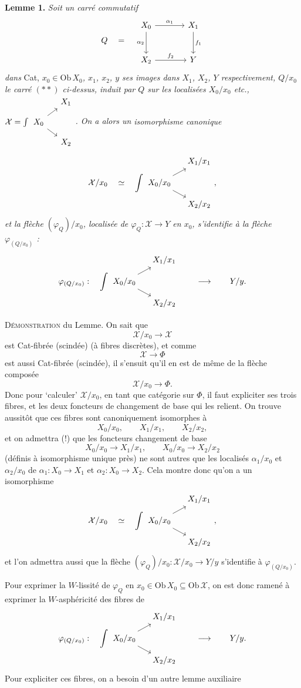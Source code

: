 \documentclass[11pt]{article}
\newcommand{\printedpage}[1]{\marginpar{\footnotesize p.~#1}}
\newcommand{\msp}[1]{\marginpar{\footnotesize [#1]}}
\newcommand{\intdiag}[3]{\int\begin{tikzcd}[row sep=small,column sep=small,ampersand replacement=\&,baseline=(\tikzcdmatrixname-2-1.base)] \& #2 \\ #1 \arrow[ur]\arrow[dr] \& \\ \& #3 \end{tikzcd}}
\begin{document}
\noindent\textbf{Lemme 1.} \textit{Soit un carré commutatif}
\[
Q \quad = \quad
\begin{tikzcd}[row sep=large,column sep=large]
X_0 \arrow[r, "\alpha_1"] \arrow[d, "\alpha_2"'] & X_1 \arrow[d, "f_1"] \\
X_2 \arrow[r, "f_2"] & Y
\end{tikzcd}
\]
\textit{dans} Cat, \textit{$x_0\in\mathrm{Ob}\,X_0$, $x_1$, $x_2$, $y$ ses images dans $X_1$, $X_2$, $Y$ respectivement, $Q/x_0$ le carré $(**)$ ci-dessus, induit par $Q$ sur les localisées $X_0/x_0$ etc., $\mathcal{X} = \intdiag{X_0}{X_1}{X_2}$. On a alors un}
\printedpage{105}
\msp{page 153}
\textit{isomorphisme canonique}
\[
\mathcal{X}/x_0 \quad\simeq\quad \intdiag{X_0/x_0}{X_1/x_1}{X_2/x_2} ,
\]
\textit{et la flèche $(\varphi_Q)/x_0$, localisée de $\varphi_Q : \mathcal{X}\longrightarrow Y$ en $x_0$, s'identifie à la flèche $\varphi_{(Q/x_0)}$ :}
\[
\varphi_{(Q/x_0)} : \quad \intdiag{X_0/x_0}{X_1/x_1}{X_2/x_2} \qquad\longrightarrow\qquad Y/y.
\]

\noindent\textsc{Démonstration} du Lemme. On sait que
\[
\mathcal{X}/x_0\longrightarrow\mathcal{X}
\]
est Cat-fibrée (scindée) (à fibres discrètes), et comme
\[
\mathcal{X}\longrightarrow\Phi
\]
est aussi Cat-fibrée (scindée), il s'ensuit qu'il en est de même de la flèche composée
\[
\mathcal{X}/x_0\longrightarrow\Phi.
\]
Donc pour `calculer' $\mathcal{X}/x_0$, en tant que catégorie sur $\Phi$, il faut expliciter ses trois fibres, et les deux foncteurs de changement de base qui les relient. On trouve aussitôt que ces fibres sont canoniquement isomorphes à
\[
X_0/x_0, \qquad X_1/x_1, \qquad X_2/x_2,
\]
et on admettra (!) que les foncteurs changement de base
\msp{page 154}
\[
X_0/x_0\longrightarrow X_1/x_1, \qquad X_0/x_0\longrightarrow X_2/x_2
\]
(définis à isomorphisme unique près) ne sont autres que les localisés $\alpha_1/x_0$ et $\alpha_2/x_0$ de $\alpha_1 : X_0\longrightarrow X_1$ et $\alpha_2 : X_0\longrightarrow X_2$. Cela montre donc qu'on a un isomorphisme
\[
\mathcal{X}/x_0 \quad\simeq\quad \intdiag{X_0/x_0}{X_1/x_1}{X_2/x_2} ,
\]
\printedpage{106}
et l'on admettra aussi que la flèche $(\varphi_Q)/x_0 : \mathcal{X}/x_0\longrightarrow Y/y$ s'identifie à $\varphi_{(Q/x_0)}$.

Pour exprimer la $W$-lissité de $\varphi_Q$ en $x_0\in\mathrm{Ob}\,X_0\subseteq\mathrm{Ob}\,\mathcal{X}$, on est donc ramené à exprimer la $W$-asphéricité des fibres de
\[
\varphi_{(Q/x_0)} : \quad \intdiag{X_0/x_0}{X_1/x_1}{X_2/x_2} \qquad\longrightarrow\qquad Y/y.
\]
Pour expliciter ces fibres, on a besoin d'un autre lemme auxiliaire
\end{document}
